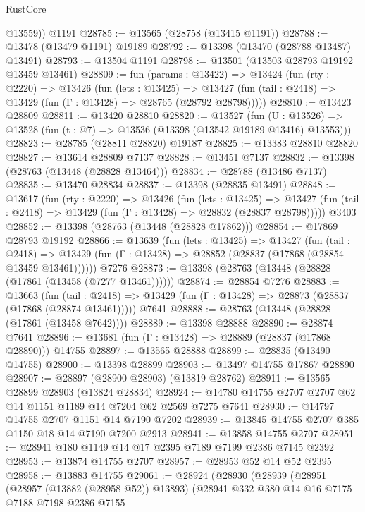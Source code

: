 \begin{lexlean}{RustCore}
\begin{coremodule}
        @13559))
    @1191
@28785 := @13565 (@28758 (@13415 @1191))
@28788 := @13478 (@13479 @1191) @19189
@28792 := @13398 (@13470 (@28788 @13487) @13491)
@28793 := @13504 @1191
@28798 := @13501 (@13503 @28793 @19192 @13459 @13461)
@28809 := fun (params : @13422) =>
  @13424
    (fun (rty : @2220) =>
    @13426
      (fun (lets : @13425) =>
      @13427 (fun (tail : @2418) => @13429 (fun (Γ : @13428) => @28765 (@28792 @28798)))))
@28810 := @13423 @28809
@28811 := @13420 @28810
@28820 := @13527
    (fun (U : @13526) => @13528 (fun (t : @7) => @13536 (@13398 (@13542 @19189 @13416) @13553)))
@28823 := @28785 (@28811 @28820) @19187
@28825 := @13383 @28810 @28820
@28827 := @13614 @28809 @7137
@28828 := @13451 @7137
@28832 := @13398 (@28763 (@13448 (@28828 @13464)))
@28834 := @28788 (@13486 @7137)
@28835 := @13470 @28834
@28837 := @13398 (@28835 @13491)
@28848 := @13617
    (fun (rty : @2220) =>
    @13426
      (fun (lets : @13425) =>
      @13427 (fun (tail : @2418) => @13429 (fun (Γ : @13428) => @28832 (@28837 @28798)))))
    @3403
@28852 := @13398 (@28763 (@13448 (@28828 @17862)))
@28854 := @17869 @28793 @19192
@28866 := @13639
    (fun (lets : @13425) =>
    @13427
      (fun (tail : @2418) =>
      @13429 (fun (Γ : @13428) => @28852 (@28837 (@17868 (@28854 @13459 @13461))))))
    @7276
@28873 := @13398 (@28763 (@13448 (@28828 (@17861 (@13458 (@7277 @13461))))))
@28874 := @28854 @7276
@28883 := @13663
    (fun (tail : @2418) => @13429 (fun (Γ : @13428) => @28873 (@28837 (@17868 (@28874 @13461)))))
    @7641
@28888 := @28763 (@13448 (@28828 (@17861 (@13458 @7642))))
@28889 := @13398 @28888
@28890 := @28874 @7641
@28896 := @13681 (fun (Γ : @13428) => @28889 (@28837 (@17868 @28890))) @14755
@28897 := @13565 @28888
@28899 := @28835 (@13490 @14755)
@28900 := @13398 @28899
@28903 := @13497 @14755 @17867 @28890
@28907 := @28897 (@28900 @28903) (@13819 @28762)
@28911 := @13565 @28899 @28903 (@13824 @28834)
@28924 := @14780 @14755 @2707 @2707 @62 @14 @1151 @1189 @14 @7204 @62 @2569 @7275 @7641
@28930 := @14797 @14755 @2707 @1151 @14 @7190 @7202
@28939 := @13845 @14755 @2707 @385 @1150 @18 @14 @7190 @7200 @2913
@28941 := @13858 @14755 @2707
@28951 := @28941 @180 @1149 @14 @17 @2395 @7189 @7199 @2386 @7145 @2392
@28953 := @13874 @14755 @2707
@28957 := @28953 @52 @14 @52 @2395
@28958 := @13883 @14755
@29061 := @28924
    (@28930
      (@28939
        (@28951
          (@28957 (@13882 (@28958 @52)) @13893)
          (@28941
            @332
            @380
            @14
            @16
            @7175
            @7188
            @7198
            @2386
            @7155

\end{coremodule}
\end{lexlean}
